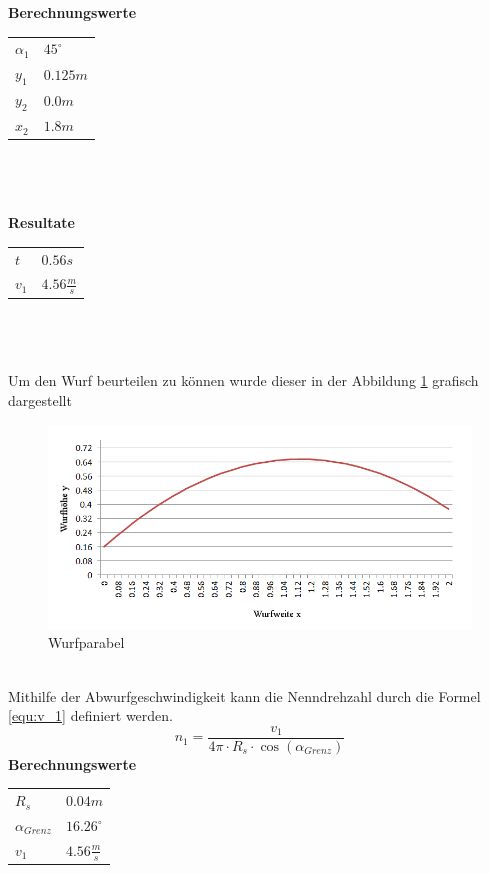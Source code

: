 \newpage
\textbf{Berechnungswerte}\\
\begin{tabular}{ll}
	\rule{0pt}{11pt} $\alpha_1$ & $45^\circ$ \\
	\rule{0pt}{11pt} $y_1$ & $0.125 m$ \\
	\rule{0pt}{11pt} $y_2$ & $0.0 m$ \\
	\rule{0pt}{11pt} $x_2$ & $1.8 m$ \\
\end{tabular}\\
\\
\\
\textbf{Resultate}\\
\begin{tabular}{ll}
	\rule{0pt}{11pt} $t$ & $0.56 s$ \\
	\rule{0pt}{11pt} $v_1$ & $4.56 \frac{m}{s}$ \\
\end{tabular}\\
\\
\\
Um den Wurf beurteilen zu können wurde dieser in der Abbildung \ref{fig:Wurfparabel} 
grafisch dargestellt
\begin{figure}[h!]
	\centering
	\includegraphics[width=1\textwidth,clip,trim=7mm 7mm 7mm 0mm]
	{Enddokumentation/Anhang/Bilder/Schiefer_Wurf.jpg}
	\caption{Wurfparabel}
	\label{fig:Wurfparabel}
\end{figure}\\
Mithilfe der Abwurfgeschwindigkeit kann die Nenndrehzahl durch die Formel 
\ref{equ:v_1} definiert werden.
\begin{equation}  
    n_1 = \frac{v_1}{4\pi \cdot R_s \cdot \cos(\alpha_{Grenz})}
    \label{equ:v_1}
\end{equation}
\textbf{Berechnungswerte}\\
\begin{tabular}{ll}
	\rule{0pt}{11pt} $R_s$ & $0.04 m$ \\
	\rule{0pt}{11pt} $\alpha_{Grenz}$ & $16.26^\circ$ \\
	\rule{0pt}{11pt} $v_1$ & $4.56 \frac{m}{s}$ \\
\end{tabular}\\
